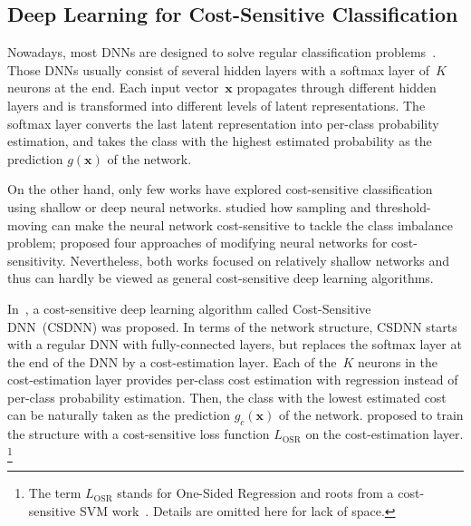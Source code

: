 \documentclass[a4paper]{article}
\begin{document}
\subsection{Deep Learning for Cost-Sensitive Classification}
  \label{sec:dl-csc}
  Nowadays, most DNNs are designed to solve regular classification problems~\cite{simonyan2014very,szegedy2015going,he2015deep}.
  Those DNNs usually consist of several hidden layers with a softmax layer of~$K$ neurons at the end.
  Each input vector~$\mathbf{x}$ propagates through different hidden layers and is transformed into different levels of latent representations.
  The softmax layer converts the last latent representation into per-class probability estimation, and takes the class with the highest estimated probability as the prediction $g(\mathbf{x})$ of the network.

  On the other hand, only few works have explored cost-sensitive classification using shallow or deep neural networks.
  \cite{zhou2006training} studied how sampling and threshold-moving can make the neural network cost-sensitive to tackle the class imbalance problem;
  \cite{kukar1998cost} proposed four approaches of modifying neural networks for cost-sensitivity.
  Nevertheless, both works focused on relatively shallow networks and thus can hardly be viewed as general cost-sensitive deep learning algorithms.

  In~\cite{YC2016}, a cost-sensitive deep learning algorithm called Cost-Sensitive DNN~(CSDNN) was proposed.
  In terms of the network structure, CSDNN starts with a regular DNN with fully-connected layers, but replaces the softmax layer at the end of the DNN by a cost-estimation layer.
  Each of the~$K$ neurons in the cost-estimation layer provides per-class cost estimation with regression instead of per-class probability estimation.
  Then, the class with the lowest estimated cost can be naturally taken as the prediction $g_c(\mathbf{x})$ of the network.
  \cite{YC2016} proposed to train the structure with a cost-sensitive loss function $L_{\mathrm{OSR}}$ on the cost-estimation layer.%
  \footnote{The term $L_{\mathrm{OSR}}$ stands for One-Sided Regression and roots from a cost-sensitive SVM work~\cite{HT2010}. Details are omitted here for lack of space.}
\end{document}
